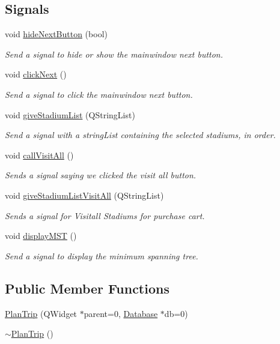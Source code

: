 \subsection*{Signals}
\begin{DoxyCompactItemize}
\item 
void \hyperlink{class_plan_trip_aca48bc2b3be5f6fb459efeb3496c5466}{hide\+Next\+Button} (bool)
\begin{DoxyCompactList}\small\item\em Send a signal to hide or show the mainwindow next button. \end{DoxyCompactList}\item 
void \hyperlink{class_plan_trip_a996ab77b2600758fcaa5c98dfa77f2fd}{click\+Next} ()
\begin{DoxyCompactList}\small\item\em Send a signal to click the mainwindow next button. \end{DoxyCompactList}\item 
void \hyperlink{class_plan_trip_ac8896fbaa74477f262824c7276fbd90f}{give\+Stadium\+List} (Q\+String\+List)
\begin{DoxyCompactList}\small\item\em Send a signal with a string\+List containing the selected stadiums, in order. \end{DoxyCompactList}\item 
void \hyperlink{class_plan_trip_a8f4321d1518eaf73049755add0c9acda}{call\+Visit\+All} ()
\begin{DoxyCompactList}\small\item\em Sends a signal saying we clicked the visit all button. \end{DoxyCompactList}\item 
void \hyperlink{class_plan_trip_a11511d0b19fa50cec8e1c166b71e3843}{give\+Stadium\+List\+Visit\+All} (Q\+String\+List)
\begin{DoxyCompactList}\small\item\em Sends a signal for Visitall Stadiums for purchase cart. \end{DoxyCompactList}\item 
void \hyperlink{class_plan_trip_af5dfa60d754eb1b742fa75f8ea31ac2b}{display\+M\+ST} ()
\begin{DoxyCompactList}\small\item\em Send a signal to display the minimum spanning tree. \end{DoxyCompactList}\end{DoxyCompactItemize}
\subsection*{Public Member Functions}
\begin{DoxyCompactItemize}
\item 
\hyperlink{class_plan_trip_a560e5efbd99d17cbbccee68423ff17a5}{Plan\+Trip} (Q\+Widget $\ast$parent=0, \hyperlink{class_database}{Database} $\ast$db=0)
\item 
\hyperlink{class_plan_trip_ae6a7198bf9faca413287acd7f147543a}{$\sim$\+Plan\+Trip} ()
\end{DoxyCompactItemize}



